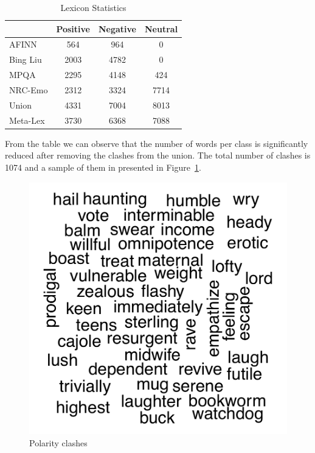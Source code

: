 \documentclass{sig-alternate}
\begin{document}
\begin{table}[htbp]
\begin{center}
\begin{tabular}{l|c|c|c}
\hline
 & Positive & Negative & Neutral \\ \hline
AFINN & 564 & 964 & 0 \\ 
Bing Liu & 2003 & 4782 & 0 \\ 
MPQA & 2295 & 4148 & 424 \\ 
NRC-Emo & 2312 & 3324 & 7714 \\ \hline
Union & 4331 & 7004 & 8013 \\ 
Meta-Lex & 3730 & 6368 & 7088 \\ \hline
\end{tabular}
\end{center}
\caption{Lexicon Statistics}
\label{tab:lexstats}
\end{table}

From the table we can observe that the number of words per class is significantly reduced after removing the clashes from the union. The total number of clashes is 1074 and a sample of them in presented in Figure~\ref{fig:word_clash}. 
\begin{figure}[ht]
	\centering
	\includegraphics[scale=0.3]{clashes.pdf}
	\caption{Polarity clashes}
	\label{fig:word_clash}
\end{figure}
\end{document}
